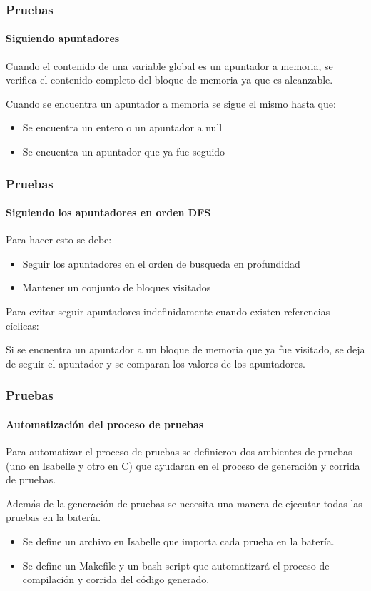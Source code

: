 \begin{frame}
\frametitle{Pruebas}
\framesubtitle{Siguiendo apuntadores}

Cuando el contenido de una variable global es un apuntador a memoria, se verifica el contenido completo del bloque de memoria ya que es alcanzable.
\bigskip
\pause

Cuando se encuentra un apuntador a memoria se sigue el mismo hasta que:
\begin{itemize}
\item{Se encuentra un entero o un apuntador a null}
\item{Se encuentra un apuntador que ya fue seguido}
\end{itemize}
\bigskip

\end{frame}


\begin{frame}
\frametitle{Pruebas}
\framesubtitle{Siguiendo los apuntadores en orden DFS}

Para hacer esto se debe:
\begin{itemize}
\item{Seguir los apuntadores en el orden de busqueda en profundidad}
\item{Mantener un conjunto de bloques visitados}
\end{itemize}


Para evitar seguir apuntadores indefinidamente cuando existen referencias cíclicas:

Si se encuentra un apuntador a un bloque de memoria que ya fue visitado, se deja de seguir el apuntador y se comparan los valores de los apuntadores.

\end{frame}


\begin{frame}
\frametitle{Pruebas}
\framesubtitle{Automatización del proceso de pruebas}

Para automatizar el proceso de pruebas se definieron dos ambientes de pruebas (uno en Isabelle y otro en C) que ayudaran en el proceso de generación y corrida de pruebas.
\bigskip
\pause

Además de la generación de pruebas se necesita una manera de ejecutar todas las pruebas en la batería.
\pause
\bigskip

\begin{itemize}
\item{Se define un archivo en Isabelle que importa cada prueba en la batería.}
\item{Se define un Makefile y un bash script que automatizará el proceso de compilación y corrida del código generado.}
\end{itemize}

\end{frame}
